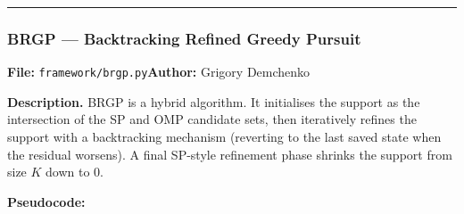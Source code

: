 \documentclass[12pt,a4paper]{article}
\newcommand{\cs}[1]{\texttt{#1}}          %
\begin{document}
\bigskip\hrule\bigskip

\subsubsection{BRGP --- Backtracking Refined Greedy Pursuit}

\textbf{File:} \cs{framework/brgp.py}\quad\textbf{Author:} Grigory Demchenko

\textbf{Description.}  BRGP is a hybrid algorithm.  It initialises the support
as the intersection of the SP and OMP candidate sets, then iteratively refines
the support with a backtracking mechanism (reverting to the last saved state
when the residual worsens).  A final SP-style refinement phase shrinks the
support from size $K$ down to 0.

\textbf{Pseudocode:}
\end{document}
